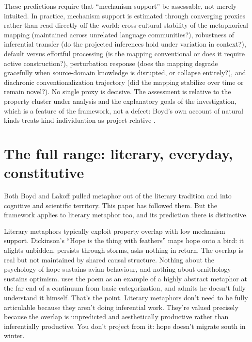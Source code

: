 \documentclass[12pt]{article}
\begin{document}
These predictions require that \enquote{mechanism support} be assessable, not merely intuited. In practice, mechanism support is estimated through converging proxies rather than read directly off the world: cross-cultural stability of the metaphorical mapping (maintained across unrelated language communities?), robustness of inferential transfer (do the projected inferences hold under variation in context?), default versus effortful processing (is the mapping conventional or does it require active construction?), perturbation response (does the mapping degrade gracefully when source-domain knowledge is disrupted, or collapse entirely?), and diachronic conventionalization trajectory (did the mapping stabilize over time or remain novel?). No single proxy is decisive. The assessment is relative to the property cluster under analysis and the explanatory goals of the investigation, which is a feature of the framework, not a defect: Boyd's own account of natural kinds treats kind-individuation as project-relative \citep[532]{boyd1993metaphor}.

\section{The full range: literary, everyday, constitutive}
\label{sec:literary}

Both Boyd and Lakoff pulled metaphor out of the literary tradition and into cognitive and scientific territory. This paper has followed them. But the framework applies to literary metaphor too, and its prediction there is distinctive.

Literary metaphors typically exploit property overlap with low mechanism support. Dickinson's \enquote{Hope is the thing with feathers} maps hope onto a bird: it alights unbidden, persists through storms, asks nothing in return. The overlap is real but not maintained by shared causal structure. Nothing about the psychology of hope sustains avian behaviour, and nothing about ornithology sustains optimism. \textcite{cooperrider2026} uses the poem as an example of a highly abstract metaphor at the far end of a continuum from basic categorization, and admits he doesn't fully understand it himself. That's the point. Literary metaphors don't need to be fully articulable because they aren't doing inferential work. They're valued precisely because the overlap is unpredicted and aesthetically productive rather than inferentially productive. You don't project from it: hope doesn't migrate south in winter.
\end{document}
